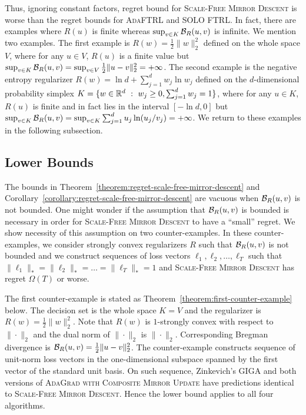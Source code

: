 Thus, ignoring constant factors, regret bound for \textsc{Scale-Free Mirror
Descent} is worse than the regret bounds for \textsc{AdaFTRL} and \textsc{SOLO
FTRL}.  In fact, there are examples where $R(u)$ is finite whereas $\sup_{v \in
K} \mathcal{B}_R(u,v)$ is infinite. We mention two examples. The first example is $R(w) =
\frac{1}{2}\|w\|_2^2$ defined on the whole space $V$, where for any $u \in V$,
$R(u)$ is a finite value but $\sup_{v \in K} \mathcal{B}_R(u,v) = \sup_{v \in V}
\frac{1}{2}\|u-v\|_2^2 = +\infty$. The second example is the negative entropy
regularizer $R(w) = \ln d  + \sum_{j=1}^d w_j \ln w_j$ defined on the
$d$-dimensional probability simplex $K = \{ w \in \mathbb{R}^d ~:~ w_j \ge 0,
\sum_{j=1}^d w_j = 1 \}$, where for any $u \in K$, $R(u)$ is finite and in fact
lies in the interval $[-\ln d, 0]$ but $\sup_{v \in K} \mathcal{B}_R(u,v) = \sup_{v \in K}
\sum_{j=1}^d u_j \ln(u_j/v_j) = + \infty$. We return to these examples in the
following subsection.

\subsection{Lower Bounds}

The bounds in Theorem~\ref{theorem:regret-scale-free-mirror-descent} and
Corollary~\ref{corollary:regret-scale-free-mirror-descent} are vacuous when
$\mathcal{B}_R(u,v)$ is not bounded. One might wonder if the assumption that
$\mathcal{B}_R(u,v)$ is bounded is necessary in order for \textsc{Scale-Free Mirror Descent}
to have a ``small'' regret. We show necessity of this assumption on
two counter-examples.  In these
counter-examples, we consider strongly convex regularizers $R$ such that
$\mathcal{B}_R(u,v)$ is not bounded and we construct sequences of loss vectors
$\ell_1, \ell_2, \dots, \ell_T$ such that $\|\ell_1\|_* = \|\ell_2\|_* = \dots
= \|\ell_T\|_* = 1$ and \textsc{Scale-Free Mirror Descent} has regret
$\Omega(T)$ or worse.

The first counter-example is stated as
Theorem~\ref{theorem:first-counter-example} below. The decision set is the
whole space $K=V$ and the regularizer is $R(w) = \frac{1}{2}\|w\|_2^2$. Note
that $R(w)$ is $1$-strongly convex with respect to $\|\cdot\|_2$ and the dual
norm of $\|\cdot\|_2$ is $\|\cdot\|_2$. Corresponding Bregman divergence is
$\mathcal{B}_R(u,v) = \frac{1}{2}\|u-v\|_2^2$. The counter-example constructs
sequence of unit-norm loss vectors in the one-dimensional subspace spanned by
the first vector of the standard unit basis.  On such sequence, Zinkevich's
\textsc{GIGA} and both versions of \textsc{AdaGrad with Composite Mirror
Update} have predictions identical to \textsc{Scale-Free Mirror Descent}. Hence
the lower bound applies to all four algorithms.

